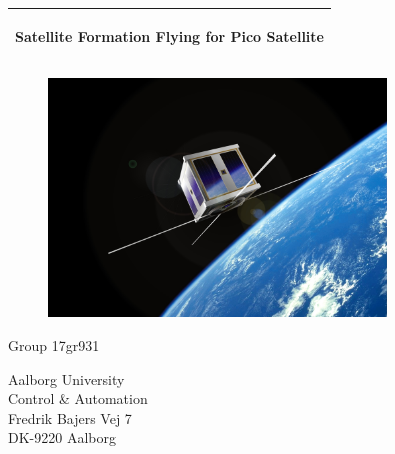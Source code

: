 %
\begin{titlepage}
  \addtolength{\hoffset}{0.5\evensidemargin-0.5\oddsidemargin} %
  \noindent%
  \begin{tabular}{@{}p{\textwidth}@{}}
    \toprule[2pt]
    \midrule
    \vspace{0.2cm}
    \begin{center}
    \Huge{\textbf{
      Satellite Formation Flying for Pico Satellite %
    }}
    \end{center}
%
    \vspace{0.2cm}\\
    \midrule
    \toprule[2pt]
  \end{tabular}
   \vspace{0.55 cm}
  \begin{figure}[!ht]
\centering
\includegraphics[width=0.8\textwidth]{figures/aau-sat}
\label{fig:forside}
\end{figure}
  \vspace{0.6 cm}
  \begin{center}
    \vspace{0.2cm}
    {\Large
      Group 17gr931%
    }
  \end{center}
  \begin{center}
  Aalborg University\\
  Control \& Automation\\
  Fredrik Bajers Vej 7\\
  DK-9220 Aalborg
  \end{center}
\end{titlepage}

\clearpage